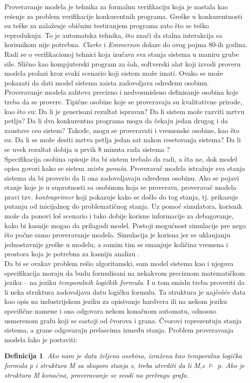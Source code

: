\documentclass[a4paper]{article}
\newtheorem{definicija}{Definicija}[section]
\begin{document}
Proveravanje modela je tehnika za formalnu verifikaciju koja je nastala kao rešenje za problem verifikacije konkurentnih programa. Greške u konkurentnosti su teške za nalaženje običnim testiranjem programa zato što se teško reprodukuju. To je automatska tehnika, što znači da stalna interakcija sa korisnikom nije potrebna. \textit{Clarke} i \textit{Emmerson} dolaze do ovog pojma 80-ih godina. Radi se o verifikacionoj tehnici koja izučava sva stanja sistema u maniru grube sile. Slično kao kompjuterski program za šah, softverski alat koji izvodi proveru modela prolazi kroz svaki scenario koji sistem može imati. Ovako se može pokazati da dati model sistema zaista zadovoljava određenu osobinu. Proveravanje modela zahteva precizno i nedvosmisleno definisanje osobina koje treba da se provere. Tipične osobine koje se proveravaju su kvalitativne prirode, kao što su: Da li je generisani rezultat ispravan? Da li sistem može razviti mrtvu petlju? Da li dva konkurentna programa mogu da čekaju jedan drugog i da zaustave ceo sistem? Takođe, mogu se proveravati i vremenske osobine, kao što su: Da li se može desiti mrtva petlja jedan sat nakon resetovanja sistema? Da li se uvek rezultat dobija u prvih 8 minuta rada sistema \cite{principles}? \\

Specifikacija osobina opisuje šta bi sistem trebalo da radi, a šta ne, dok model opisa govori kako se sistem \textit{zaista ponaša}. Proveravač modela istražuje sva stanja sistema da bi proverio da li ona zadovoljavaju određenu osobinu. Ako se pojavi stanje koje je u suprotnosti sa osobinom koja se proverava, proveravač modela pravi tzv. \textit{kontraprimer} koji pokazuje kako se došlo do tog stanja, tj. prikazuje putanju od inicijalnog do problematičnog stanja. Uz pomoć simulatora, korisnik može da ponovi loš scenario i tako dobije korisne informacije za debagovanje, kako bi kasnije mogao da prilagodi model. Postoji mogućnost simulacije pre nego što počne samo proveravanje modela. Simulacija je korisna jer se uklanjanju jednostavnije greške u modelu, a samim tim se smanjuje količina vremena i prostora koja je potrebna za kasniju analizu \cite{principles}.\\ 

Da bi se ovakav problem rešio algoritamski, sam model sistema kao i njegova specifikacija moraju da budu formulisani na nekakvom preciznom matematičkom jeziku -- na jeziku \textit{temporalnih logičkih formula}. I u tom smislu treba proveriti da li neka struktura zadovoljava datu logičku formulu. Ta struktura je najčešće data kao opis na industrijskom jeziku za opisivanje hardvera ili na nekom jeziku specifične namene i ona odgovara  nekom konačnom automatu, odnosno  usmerenom grafu koji se sastoji od čvorova i grana. Čvorovi reprezentuju stanja sistema, a grane odgovaraju prelascima između stanja. Problem proveravanja modela lako je postaviti:
\begin{definicija}
Ako nam je data željena osobina, izražena kao temporalna logička formula p i struktura M sa skupom stanja s, treba utvrditi da li  M,s $\vDash$ p. Ako je struktura M konačna, proveravanje se svodi na pretragu grafa. \\
\end{definicija}
\end{document}
